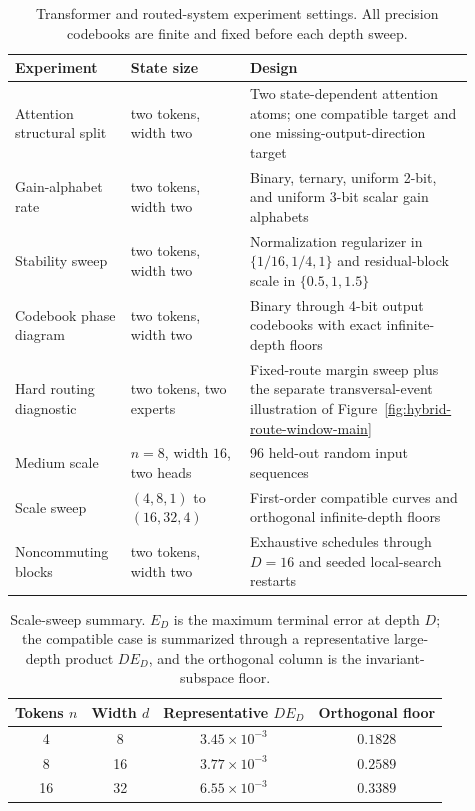 \documentclass[twoside,11pt]{article}
\begin{document}
\begin{table}[ht]
\centering
\caption{Transformer and routed-system experiment settings.  All precision
codebooks are finite and fixed before each depth sweep.}
\label{tab:transformer-settings}
\small
\begin{tabular}{p{0.22\linewidth}p{0.24\linewidth}p{0.45\linewidth}}
\toprule
Experiment & State size & Design\\
\midrule
Attention structural split & two tokens, width two & Two state-dependent attention atoms; one compatible target and one missing-output-direction target\\
Gain-alphabet rate & two tokens, width two & Binary, ternary, uniform 2-bit, and uniform 3-bit scalar gain alphabets\\
Stability sweep & two tokens, width two & Normalization regularizer in $\{1/16,1/4,1\}$ and residual-block scale in $\{0.5,1,1.5\}$\\
Codebook phase diagram & two tokens, width two & Binary through 4-bit output codebooks with exact infinite-depth floors\\
Hard routing diagnostic & two tokens, two experts & Fixed-route margin sweep plus the separate transversal-event illustration of Figure~\ref{fig:hybrid-route-window-main}\\
Medium scale & $n=8$, width $16$, two heads & 96 held-out random input sequences\\
Scale sweep & $(4,8,1)$ to $(16,32,4)$ & First-order compatible curves and orthogonal infinite-depth floors\\
Noncommuting blocks & two tokens, width two & Exhaustive schedules through $D=16$ and seeded local-search restarts\\
\bottomrule
\end{tabular}
\end{table}

\begin{table}[ht]
\centering
\caption{Scale-sweep summary.  $E_D$ is the maximum terminal error at depth
$D$; the compatible case is summarized through a representative large-depth
product $DE_D$, and the orthogonal column is the invariant-subspace floor.}
\label{tab:scale-sweep-summary}
\small
\begin{tabular}{cccc}
\toprule
Tokens $n$ & Width $d$ & Representative $DE_D$ & Orthogonal floor\\
\midrule
4 & 8 & $3.45\times10^{-3}$ & $0.1828$\\
8 & 16 & $3.77\times10^{-3}$ & $0.2589$\\
16 & 32 & $6.55\times10^{-3}$ & $0.3389$\\
\bottomrule
\end{tabular}
\end{table}
\end{document}
